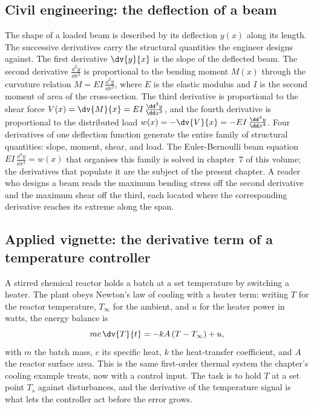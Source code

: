 \subsection{Civil engineering: the deflection of a beam}

The shape of a loaded beam is described by its deflection $y(x)$
along its length. The successive derivatives carry the structural
quantities the engineer designs against. The first derivative
$\dv{y}{x}$ is the slope of the deflected beam. The second
derivative $\frac{\dd^{2} y}{\dd x^{2}}$ is proportional to the
bending moment $M(x)$ through the curvature relation $M = E I \,
\frac{\dd^{2} y}{\dd x^{2}}$, where $E$ is the elastic modulus and
$I$ is the second moment of area of the cross-section. The third
derivative is proportional to the shear force $V(x) = \dv{M}{x} =
E I \, \frac{\dd^{3} y}{\dd x^{3}}$, and the fourth derivative is
proportional to the distributed load $w(x) = -\dv{V}{x} = -E I \,
\frac{\dd^{4} y}{\dd x^{4}}$. Four derivatives of one deflection
function generate the entire family of structural quantities:
slope, moment, shear, and load. The Euler-Bernoulli beam equation
$E I \, \frac{\dd^{4} y}{\dd x^{4}} = w(x)$ that organises this
family is solved in chapter~7 of this volume; the derivatives that
populate it are the subject of the present chapter. A reader who
designs a beam reads the maximum bending stress off the second
derivative and the maximum shear off the third, each located where
the corresponding derivative reaches its extreme along the span.

\subsection{Applied vignette: the derivative term of a temperature
controller}

A stirred chemical reactor holds a batch at a set temperature by
switching a heater. The plant obeys Newton's law of cooling with a
heater term: writing $T$ for the reactor temperature, $T_{\infty}$
for the ambient, and $u$ for the heater power in watts, the energy
balance is
\[
mc\,\dv{T}{t} = -kA\,(T - T_{\infty}) + u,
\]
with $m$ the batch mass, $c$ its specific heat, $k$ the heat-transfer
coefficient, and $A$ the reactor surface area. This is the same
first-order thermal system the chapter's cooling example treats, now
with a control input. The task is to hold $T$ at a set point $T_{s}$
against disturbances, and the derivative of the temperature signal is
what lets the controller act before the error grows.

